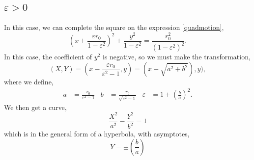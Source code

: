 \documentclass{book}
\begin{document}
\subsection{$\varepsilon > 0$}
In this case, we can complete the square on the expression \eqref{quadmotion},
\begin{equation}
    \left(x + \frac{\varepsilon r_0}{1-\varepsilon^2}\right)^2 + \frac{y^2}{1-\varepsilon^2} = \frac{r_0^2}{\left(1-\varepsilon^2\right)^2}.
\end{equation}
In this case, the coefficient of $y^2$ is negative, so we must make the transformation,
\begin{equation}
    (X,Y) = \left(x- \frac{\varepsilon r_0}{\varepsilon^2 -1},y\right) = (x - \sqrt{a^2 + b^2}),y),
\end{equation}
where we define,
\begin{align}
    a & = \frac{r_0}{\varepsilon^2 - 1} & b & = \frac{r_0}{\sqrt{\varepsilon^2 - 1}} & \varepsilon & = 1 + \left(\frac{b}{a}\right)^2.
\end{align}
We then get a curve,
\begin{equation}
    \frac{X^2}{a^2} - \frac{Y^2}{b^2} = 1
\end{equation}
which is in the general form of a hyperbola, with asymptotes,
\begin{equation}
    Y = \pm \left(\frac{b}{a}\right)
\end{equation}
\end{document}
